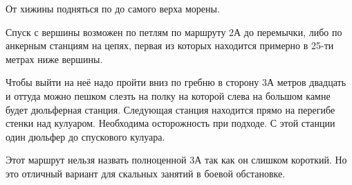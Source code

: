 От хижины \geoLighthouse{} подняться по  до самого верха морены.





Спуск с вершины возможен по петлям по маршруту 2А до перемычки, либо по анкерным станциям на цепях, первая из которых находится примерно в
25-ти метрах ниже вершины.

Чтобы выйти на неё надо пройти вниз по гребню в сторону 3А метров двадцать и оттуда можно пешком слезть на полку на которой слева на большом
камне будет дюльферная станция. Следующая станция находится прямо на перегибе стенки над кулуаром. Необходима осторожность при подходе. С
этой станции один дюльфер до спускового кулуара.

Этот маршрут нельзя назвать полноценной 3А так как он слишком короткий. Но это отличный вариант для скальных занятий в боевой обстановке.
